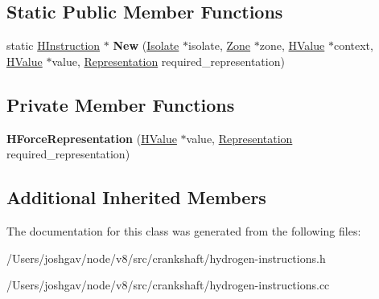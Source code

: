 \subsection*{Static Public Member Functions}
\begin{DoxyCompactItemize}
\item 
static \hyperlink{classv8_1_1internal_1_1_h_instruction}{H\+Instruction} $\ast$ {\bfseries New} (\hyperlink{classv8_1_1internal_1_1_isolate}{Isolate} $\ast$isolate, \hyperlink{classv8_1_1internal_1_1_zone}{Zone} $\ast$zone, \hyperlink{classv8_1_1internal_1_1_h_value}{H\+Value} $\ast$context, \hyperlink{classv8_1_1internal_1_1_h_value}{H\+Value} $\ast$value, \hyperlink{classv8_1_1internal_1_1_representation}{Representation} required\+\_\+representation)\hypertarget{classv8_1_1internal_1_1_h_force_representation_ac05da70c03cb075e9f1c077a5b86c7bc}{}\label{classv8_1_1internal_1_1_h_force_representation_ac05da70c03cb075e9f1c077a5b86c7bc}

\end{DoxyCompactItemize}
\subsection*{Private Member Functions}
\begin{DoxyCompactItemize}
\item 
{\bfseries H\+Force\+Representation} (\hyperlink{classv8_1_1internal_1_1_h_value}{H\+Value} $\ast$value, \hyperlink{classv8_1_1internal_1_1_representation}{Representation} required\+\_\+representation)\hypertarget{classv8_1_1internal_1_1_h_force_representation_acf0fa7351258cc854e05c6e6a10860e2}{}\label{classv8_1_1internal_1_1_h_force_representation_acf0fa7351258cc854e05c6e6a10860e2}

\end{DoxyCompactItemize}
\subsection*{Additional Inherited Members}


The documentation for this class was generated from the following files\+:\begin{DoxyCompactItemize}
\item 
/\+Users/joshgav/node/v8/src/crankshaft/hydrogen-\/instructions.\+h\item 
/\+Users/joshgav/node/v8/src/crankshaft/hydrogen-\/instructions.\+cc\end{DoxyCompactItemize}
